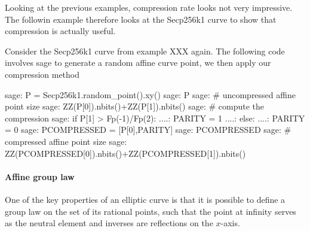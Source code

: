 Looking at the previous examples, compression rate looks not very impressive. The followin example therefore looks at the Secp256k1 curve to show that compression is actually useful.
\begin{example}
Consider the Secp256k1 curve from example XXX again. The following code involves sage to generate a random affine curve point, we then apply our compression method
\begin{sagecommandline}
sage: P = Secp256k1.random_point().xy()
sage: P
sage: # uncompressed affine point size
sage: ZZ(P[0]).nbits()+ZZ(P[1]).nbits()
sage: # compute the compression
sage: if P[1] > Fp(-1)/Fp(2):
....:     PARITY = 1
....: else:
....:     PARITY = 0
sage: PCOMPRESSED = [P[0],PARITY]
sage: PCOMPRESSED
sage: # compressed affine point size
sage: ZZ(PCOMPRESSED[0]).nbits()+ZZ(PCOMPRESSED[1]).nbits()
\end{sagecommandline}
\end{example}
\paragraph{Affine group law}
One of the key properties of an elliptic curve is that it is possible to define a group law on the set of its rational points, such that the point at infinity serves as the neutral element and inverses are reflections on the $x$-axis.

